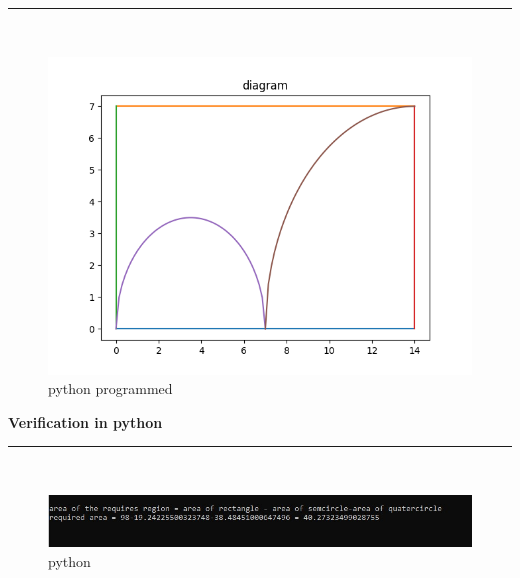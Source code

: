 \documentclass{article}
\begin{document}
\pagebreak
\newpage

\rule{\textwidth}{0.4pt}\\
\begin{figure}[h!]
    \centering
    \includegraphics[scale = 0.5]{Figure_2.png}
    \caption{python programmed}
    \label{fig:my_label}
\end{figure}
\begin{center}
\textbf{Verification in python}    
\end{center}

\rule{\textwidth}{0.4pt}\\

\begin{figure}[h!]
    \centering
    \includegraphics[scale = 0.6]{Figure_3.jpg}
    \caption{python}
    \label{fig:my_label}
\end{figure}
\end{document}
